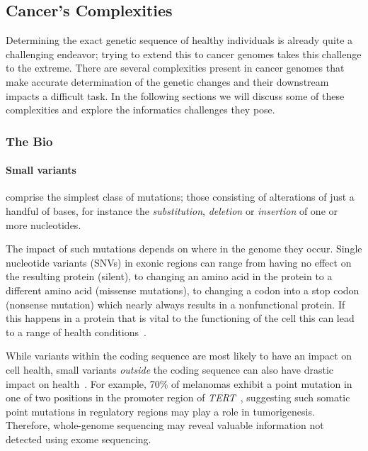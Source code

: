 \begin{justify}
\subsection{Cancer's Complexities}

Determining the exact genetic sequence of healthy individuals is already quite a challenging endeavor; trying to extend this to cancer genomes takes this challenge to the extreme. There are several complexities present in cancer genomes that make accurate determination of the genetic changes and their downstream impacts a difficult task. In the following sections we will discuss some of these complexities and explore the informatics challenges they pose.

\subsubsection{The Bio}

\paragraph{Small variants} comprise the simplest class of mutations; those consisting of alterations of just a handful of bases, for instance the \emph{substitution}, \emph{deletion} or \emph{insertion} of one or more nucleotides.

The impact of such mutations depends on where in the genome they occur. Single nucleotide variants (SNVs) in exonic regions can range from having no effect on the resulting protein (silent), to changing an amino acid in the protein to a different amino acid (missense mutations), to changing a codon into a stop codon (nonsense mutation) which nearly always results in a nonfunctional protein. If this happens in a protein that is vital to the functioning of the cell this can lead to a range of health conditions~\cite{cargill1999characterization}.

While variants within the coding sequence are most likely to have an impact on cell health, small variants \emph{outside} the coding sequence can also have drastic impact on health~\cite{zhang2015non}. For example, 70\% of melanomas exhibit a point mutation in one of two positions in the promoter region of \emph{TERT}~\cite{horn2013tert,huang2013highly}, suggesting such somatic point mutations in regulatory regions may play a role in tumorigenesis. Therefore, whole-genome sequencing may reveal valuable information not detected using exome sequencing.


\end{justify}
